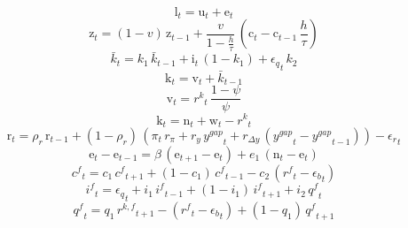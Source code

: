 \begin{dmath}
{{\mathrm{l}}}_{t}={{\mathrm{u}}}_{t}+{{\mathrm{e}}}_{t}
\end{dmath}
\begin{dmath}
{{\mathrm{z}}}_{t}=\left(1-{{v}}\right)\, {{\mathrm{z}}}_{t-1}+\frac{{{v}}}{1-\frac{{{h}}}{{{\tau}}}}\, \left({{\mathrm{c}}}_{t}-{{\mathrm{c}}}_{t-1}\, \frac{{{h}}}{{{\tau}}}\right)
\end{dmath}
\begin{dmath}
{{\bar{k}}}_{t}={{k_{1}}}\, {{\bar{k}}}_{t-1}+{{\mathrm{i}}}_{t}\, \left(1-{{k_{1}}}\right)+{{\epsilon_{q}}}_{t}\, {{k_{2}}}
\end{dmath}
\begin{dmath}
{{\mathrm{k}}}_{t}={{\mathrm{v}}}_{t}+{{\bar{k}}}_{t-1}
\end{dmath}
\begin{dmath}
{{\mathrm{v}}}_{t}={{r^{k}}}_{t}\, \frac{1-{{\psi}}}{{{\psi}}}
\end{dmath}
\begin{dmath}
{{\mathrm{k}}}_{t}={{\mathrm{n}}}_{t}+{{\mathrm{w}}}_{t}-{{r^{k}}}_{t}
\end{dmath}
\begin{dmath}
{{\mathrm{r}}}_{t}={{\rho_{r}}}\, {{\mathrm{r}}}_{t-1}+\left(1-{{\rho_{r}}}\right)\, \left({{\pi}}_{t}\, {{r_{\pi}}}+{{r_{y}}}\, {{y^{gap}}}_{t}+{{r_{\Delta y}}}\, \left({{y^{gap}}}_{t}-{{y^{gap}}}_{t-1}\right)\right)-{{\epsilon_{r}}}_{t}
\end{dmath}
\begin{dmath}
{{\mathrm{e}}}_{t}-{{\mathrm{e}}}_{t-1}={{\beta}}\, \left({{\mathrm{e}}}_{t+1}-{{\mathrm{e}}}_{t}\right)+{{e_{1}}}\, \left({{\mathrm{n}}}_{t}-{{\mathrm{e}}}_{t}\right)
\end{dmath}
\begin{dmath}
{{c^{f}}}_{t}={{c_{1}}}\, {{c^{f}}}_{t+1}+\left(1-{{c_{1}}}\right)\, {{c^{f}}}_{t-1}-{{c_{2}}}\, \left({{r^{f}}}_{t}-{{\epsilon_{b}}}_{t}\right)
\end{dmath}
\begin{dmath}
{{i^{f}}}_{t}={{\epsilon_{q}}}_{t}+{{i_{1}}}\, {{i^{f}}}_{t-1}+\left(1-{{i_{1}}}\right)\, {{i^{f}}}_{t+1}+{{i_{2}}}\, {{q^{f}}}_{t}
\end{dmath}
\begin{dmath}
{{q^{f}}}_{t}={{q_{1}}}\, {{r^{k,f}}}_{t+1}-\left({{r^{f}}}_{t}-{{\epsilon_{b}}}_{t}\right)+\left(1-{{q_{1}}}\right)\, {{q^{f}}}_{t+1}
\end{dmath}
